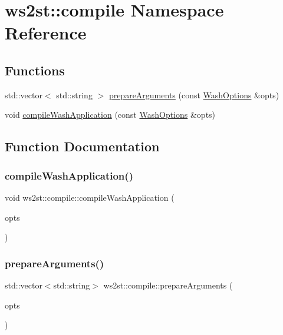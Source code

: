 \hypertarget{namespacews2st_1_1compile}{}\section{ws2st\+:\+:compile Namespace Reference}
\label{namespacews2st_1_1compile}
\subsection*{Functions}
\begin{DoxyCompactItemize}
\item 
std\+::vector$<$ std\+::string $>$ \mbox{\hyperlink{namespacews2st_1_1compile_a27611c65e4e3e3ce92476115b077d560}{prepare\+Arguments}} (const \mbox{\hyperlink{structWashOptions}{Wash\+Options}} \&opts)
\item 
void \mbox{\hyperlink{namespacews2st_1_1compile_a5ef1483fb636b5445cf04f5e288cfc51}{compile\+Wash\+Application}} (const \mbox{\hyperlink{structWashOptions}{Wash\+Options}} \&opts)
\end{DoxyCompactItemize}


\subsection{Function Documentation}
\mbox{\label{namespacews2st_1_1compile_a5ef1483fb636b5445cf04f5e288cfc51}} 
\subsubsection{\texorpdfstring{compile\+Wash\+Application()}{compileWashApplication()}}
{\footnotesize\ttfamily void ws2st\+::compile\+::compile\+Wash\+Application (\begin{DoxyParamCaption}\item[{const \mbox{\hyperlink{structWashOptions}{Wash\+Options}} \&}]{opts }\end{DoxyParamCaption})}

\mbox{\label{namespacews2st_1_1compile_a27611c65e4e3e3ce92476115b077d560}} 
\subsubsection{\texorpdfstring{prepare\+Arguments()}{prepareArguments()}}
{\footnotesize\ttfamily std\+::vector$<$std\+::string$>$ ws2st\+::compile\+::prepare\+Arguments (\begin{DoxyParamCaption}\item[{const \mbox{\hyperlink{structWashOptions}{Wash\+Options}} \&}]{opts }\end{DoxyParamCaption})}

